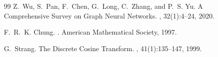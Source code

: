 \begin{notechapter}
\begin{thebibliography}{99}
Z.~Wu, S.~Pan, F.~Chen, G.~Long, C.~Zhang, and P.~S. Yu.
\newblock A Comprehensive Survey on Graph Neural Networks.
, 32(1):4--24, 2020.

F.~R.~K. Chung.
.
\newblock American Mathematical Society, 1997.

G.~Strang.
\newblock The Discrete Cosine Transform.
, 41(1):135--147, 1999.

\end{thebibliography}
\end{notechapter}
